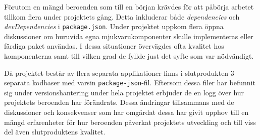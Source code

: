 Förutom en mängd beroenden som till en början krävdes för att påbörja arbetet tillkom flera under projektets gång. Detta inkluderar både \textit{dependencies} och \textit{devDependencies} i \texttt{package.json}. Under projektet uppkom flera öppna diskussioner om huruvida egna mjukvarukomponenter skulle implementeras eller färdiga paket användas. I dessa situationer övervägdes ofta kvalitet hos komponenterna samt till vilken grad de fyllde just det syfte som var nödvändigt.

Då projektet består av flera separata applikationer finns i slutprodukten 3 separata kodbaser med varsin \texttt{package-json}-fil. Eftersom dessa filer har befunnit sig under versionshantering under hela projektet erbjuder de en logg över hur projektets beroenden har förändrats. Dessa ändringar tillsammans med de diskussioner och konsekvenser som har omgärdat dessa har givit upphov till en mängd erfarenheter för hur beroenden påverkat projektets utveckling och till viss del även slutproduktens kvalitet.
